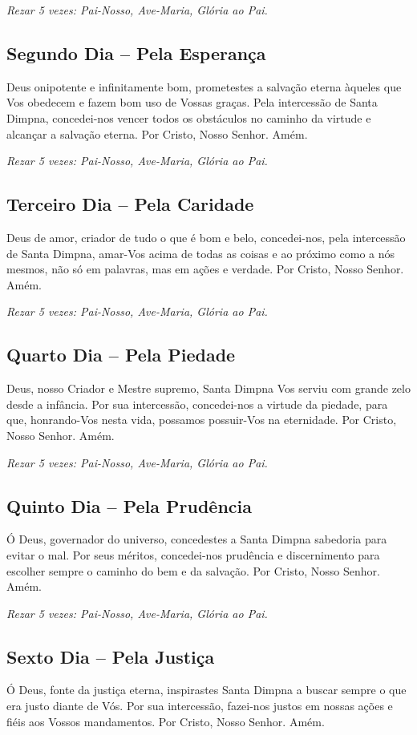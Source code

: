 \documentclass[18pt]{article}
\begin{document}
\textit{Rezar 5 vezes: Pai-Nosso, Ave-Maria, Glória ao Pai.}

\subsection*{Segundo Dia -- Pela Esperança}
Deus onipotente e infinitamente bom, prometestes a salvação eterna àqueles que Vos obedecem e fazem bom uso de Vossas graças. Pela intercessão de Santa Dimpna, concedei-nos vencer todos os obstáculos no caminho da virtude e alcançar a salvação eterna. Por Cristo, Nosso Senhor. Amém.

\textit{Rezar 5 vezes: Pai-Nosso, Ave-Maria, Glória ao Pai.}

\subsection*{Terceiro Dia -- Pela Caridade}
Deus de amor, criador de tudo o que é bom e belo, concedei-nos, pela intercessão de Santa Dimpna, amar-Vos acima de todas as coisas e ao próximo como a nós mesmos, não só em palavras, mas em ações e verdade. Por Cristo, Nosso Senhor. Amém.

\textit{Rezar 5 vezes: Pai-Nosso, Ave-Maria, Glória ao Pai.}

\subsection*{Quarto Dia -- Pela Piedade}
Deus, nosso Criador e Mestre supremo, Santa Dimpna Vos serviu com grande zelo desde a infância. Por sua intercessão, concedei-nos a virtude da piedade, para que, honrando-Vos nesta vida, possamos possuir-Vos na eternidade. Por Cristo, Nosso Senhor. Amém.

\textit{Rezar 5 vezes: Pai-Nosso, Ave-Maria, Glória ao Pai.}

\subsection*{Quinto Dia -- Pela Prudência}
Ó Deus, governador do universo, concedestes a Santa Dimpna sabedoria para evitar o mal. Por seus méritos, concedei-nos prudência e discernimento para escolher sempre o caminho do bem e da salvação. Por Cristo, Nosso Senhor. Amém.

\textit{Rezar 5 vezes: Pai-Nosso, Ave-Maria, Glória ao Pai.}

\subsection*{Sexto Dia -- Pela Justiça}
Ó Deus, fonte da justiça eterna, inspirastes Santa Dimpna a buscar sempre o que era justo diante de Vós. Por sua intercessão, fazei-nos justos em nossas ações e fiéis aos Vossos mandamentos. Por Cristo, Nosso Senhor. Amém.
\end{document}
